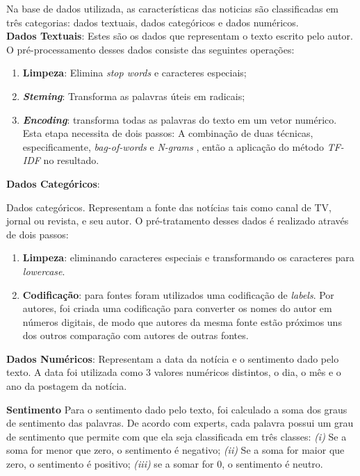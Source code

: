 Na base de dados utilizada, as características das noticias são classificadas em três categorias: dados textuais, dados categóricos e dados numéricos. \\

\textbf{Dados Textuais}: Estes são os dados que representam o texto escrito pelo autor. O pré-processamento desses dados consiste das seguintes operações: \\

\begin{enumerate}
    \item \textbf{Limpeza}: Elimina \textit{stop words} e caracteres especiais;
    \item \textbf{\textit{Steming}}: Transforma as palavras úteis em radicais;
    \item \textbf{\textit{Encoding}}: transforma todas as palavras do texto em um vetor numérico. Esta etapa necessita de dois passos: A combinação de duas técnicas, especificamente, \textit{bag-of-words} \cite{gerard1983} e \textit{N-grams} \cite{chris1985}, então a aplicação do método \textit{TF-IDF} \cite{juan2003} no resultado. 
\end{enumerate} 


\textbf{Dados Categóricos}: 


Dados categóricos. Representam a fonte das notícias tais como canal de TV, jornal ou revista, e seu autor. O pré-tratamento desses dados é realizado através de dois passos:
\begin{enumerate}
    \item \textbf{Limpeza}: eliminando caracteres especiais e transformando os caracteres para \textit{lowercase}.
    \item \textbf{Codificação}:  para fontes foram utilizados uma codificação de \textit{labels}. Por autores, foi criada uma codificação para converter os nomes do autor em números digitais, de modo que autores da mesma fonte estão próximos uns dos outros comparação com autores de outras fontes. 
\end{enumerate}


\textbf{Dados Numéricos}: Representam a data da notícia e o sentimento dado pelo texto. A data foi utilizada como 3 valores numéricos distintos, o dia, o mês e o ano da postagem da notícia. 

\textbf{Sentimento} Para o sentimento dado pelo texto, foi calculado a soma dos graus de sentimento das palavras. De acordo com experts, cada palavra possui um grau de sentimento que permite com que ela seja classificada em três classes: \textit{(i)} Se a soma for menor que zero, o sentimento é negativo; \textit{(ii)} Se a soma for maior que zero, o sentimento é positivo; \textit{(iii)} se a somar for 0, o sentimento é neutro.


